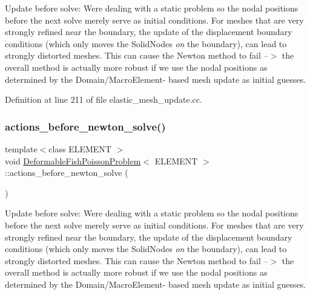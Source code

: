 Update before solve\+: We\textquotesingle{}re dealing with a static problem so the nodal positions before the next solve merely serve as initial conditions. For meshes that are very strongly refined near the boundary, the update of the displacement boundary conditions (which only moves the Solid\+Nodes {\itshape on} the boundary), can lead to strongly distorted meshes. This can cause the Newton method to fail --$>$ the overall method is actually more robust if we use the nodal positions as determined by the Domain/\+Macro\+Element-\/ based mesh update as initial guesses. 



Definition at line 211 of file elastic\+\_\+mesh\+\_\+update.\+cc.

\mbox{\label{classDeformableFishPoissonProblem_ad9d03c8349a059430f7329354033b450}} 
\subsubsection{\texorpdfstring{actions\+\_\+before\+\_\+newton\+\_\+solve()}{actions\_before\_newton\_solve()}\hspace{0.1cm}{\footnotesize\ttfamily [2/2]}}
{\footnotesize\ttfamily template$<$class E\+L\+E\+M\+E\+NT $>$ \\
void \hyperlink{classDeformableFishPoissonProblem}{Deformable\+Fish\+Poisson\+Problem}$<$ E\+L\+E\+M\+E\+NT $>$\+::actions\+\_\+before\+\_\+newton\+\_\+solve (\begin{DoxyParamCaption}{ }\end{DoxyParamCaption})\hspace{0.3cm}{\ttfamily [inline]}}



Update before solve\+: We\textquotesingle{}re dealing with a static problem so the nodal positions before the next solve merely serve as initial conditions. For meshes that are very strongly refined near the boundary, the update of the displacement boundary conditions (which only moves the Solid\+Nodes {\itshape on} the boundary), can lead to strongly distorted meshes. This can cause the Newton method to fail --$>$ the overall method is actually more robust if we use the nodal positions as determined by the Domain/\+Macro\+Element-\/ based mesh update as initial guesses. 



